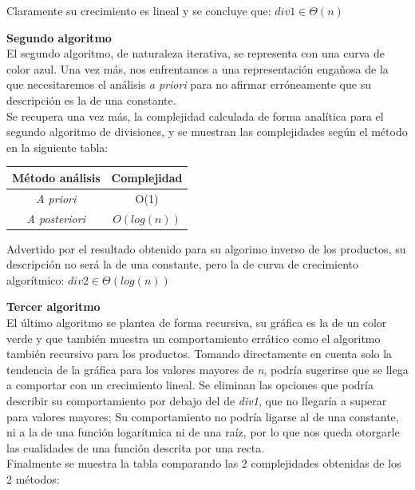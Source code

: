 \documentclass{report}
\begin{document}
               Claramente su crecimiento es lineal y se concluye que: $div1 \in \Theta(n)$
            
            \hfill \break
            
            \textbf{Segundo algoritmo}\\
                El segundo algoritmo, de naturaleza iterativa, se representa con una curva de color azul. Una vez más, nos enfrentamos a una representación engañosa de la que necesitaremos el análisis \textit{a priori} para no afirmar erróneamente que su descripción es la de una constante.\\
                Se recupera una vez más, la complejidad calculada de forma analítica para el segundo algoritmo de divisiones, y se muestran las complejidades según el método en la siguiente tabla:
                
                \begin{table}[h!]
                    \centering
                    \begin{tabular}{c | c}
                        Método análisis & Complejidad \\ \hline
                        \textit{A priori} & O(1)\\
                        \textit{A posteriori} & $O(log(n))$\\
                    \end{tabular}
                \end{table}
                
                Advertido por el resultado obtenido para su algorimo inverso de los productos, su descripción no será la de una constante, pero la de curva de crecimiento algorítmico: $div2 \in \Theta(log(n))$
            
            \hfill \break
            
            \textbf{Tercer algoritmo}\\
                El último algoritmo se plantea de forma recursiva, su gráfica es la de un color verde y que también muestra un comportamiento errático como el algoritmo también recursivo para los productos. Tomando directamente en cuenta solo la tendencia de la gráfica para los valores mayores de \textit{n}, podría sugerirse que se llega a comportar con un crecimiento lineal. Se eliminan las opciones que podría describir su comportamiento por debajo del de \textit{div1}, que no llegaría a superar para valores mayores; Su comportamiento no podría ligarse al de una constante, ni a la de una función logarítmica ni de una raíz, por lo que nos queda otorgarle las cualidades de una función descrita por una recta.\\
                Finalmente se muestra la tabla comparando las 2 complejidades obtenidas de los 2 métodos:
                
\end{document}

